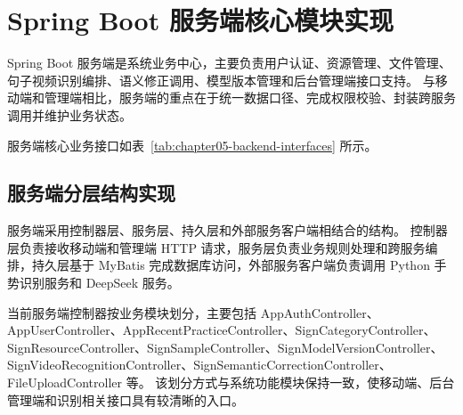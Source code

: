 
\section{Spring Boot 服务端核心模块实现}

Spring Boot 服务端是系统业务中心，主要负责用户认证、资源管理、文件管理、句子视频识别编排、语义修正调用、模型版本管理和后台管理端接口支持。
与移动端和管理端相比，服务端的重点在于统一数据口径、完成权限校验、封装跨服务调用并维护业务状态。

服务端核心业务接口如表~\ref{tab:chapter05-backend-interfaces} 所示。


\subsection{服务端分层结构实现}

服务端采用控制器层、服务层、持久层和外部服务客户端相结合的结构。
控制器层负责接收移动端和管理端 HTTP 请求，服务层负责业务规则处理和跨服务编排，持久层基于 MyBatis 完成数据库访问，外部服务客户端负责调用 Python 手势识别服务和 DeepSeek 服务。

当前服务端控制器按业务模块划分，主要包括 AppAuthController、AppUserController、AppRecentPracticeController、SignCategoryController、SignResourceController、SignSampleController、SignModelVersionController、SignVideoRecognitionController、SignSemanticCorrectionController、FileUploadController 等。
该划分方式与系统功能模块保持一致，使移动端、后台管理端和识别相关接口具有较清晰的入口。

